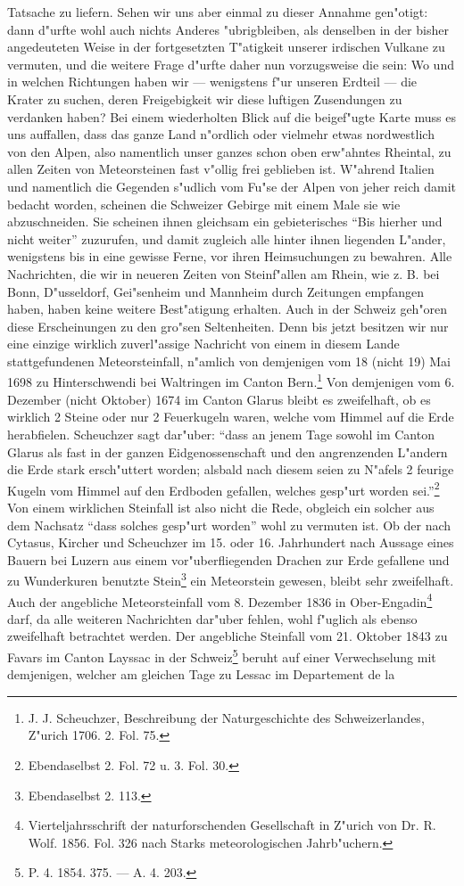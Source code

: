 \documentclass[a4paper, 8pt, oneside, polutonikogreek, german]{article}
\begin{document}
Tatsache zu liefern. Sehen wir uns aber einmal zu dieser Annahme gen"otigt: dann d"urfte wohl auch nichts Anderes "ubrigbleiben, als denselben in der bisher angedeuteten Weise in der fortgesetzten T"atigkeit unserer irdischen Vulkane zu vermuten, und die weitere Frage d"urfte daher nun vorzugsweise die sein: Wo und in welchen Richtungen haben wir --- wenigstens f"ur unseren Erdteil --- die Krater zu suchen, deren Freigebigkeit wir diese luftigen Zusendungen zu verdanken haben? Bei einem wiederholten Blick auf die beigef"ugte Karte muss es uns auffallen, dass das ganze Land n"ordlich oder vielmehr etwas nordwestlich von den Alpen, also namentlich unser ganzes schon oben erw"ahntes Rheintal, zu allen Zeiten von Meteorsteinen fast v"ollig frei geblieben ist. W"ahrend Italien und namentlich die Gegenden s"udlich vom Fu"se der Alpen von jeher reich damit bedacht worden, scheinen die Schweizer Gebirge mit einem Male sie wie abzuschneiden. Sie scheinen ihnen gleichsam ein gebieterisches "`Bis hierher und nicht weiter"' zuzurufen, und damit zugleich alle hinter ihnen liegenden L"ander, wenigstens bis in eine gewisse Ferne, vor ihren Heimsuchungen zu bewahren. Alle Nachrichten, die wir in neueren Zeiten von Steinf"allen am Rhein, wie z. B. bei Bonn, D"usseldorf, Gei"senheim und Mannheim durch Zeitungen empfangen haben, haben keine weitere Best"atigung erhalten. Auch in der Schweiz geh"oren diese Erscheinungen zu den gro"sen Seltenheiten. Denn bis jetzt besitzen wir nur eine einzige wirklich zuverl"assige Nachricht von einem in diesem Lande stattgefundenen Meteorsteinfall, n"amlich von demjenigen vom 18 (nicht 19) Mai 1698 zu Hinterschwendi bei Waltringen im Canton Bern.\footnote{J. J. Scheuchzer, Beschreibung der Naturgeschichte des Schweizerlandes, Z"urich 1706. 2. Fol. 75.} Von demjenigen vom 6. Dezember (nicht Oktober) 1674 im Canton Glarus bleibt es zweifelhaft, ob es wirklich 2 Steine oder nur 2 Feuerkugeln waren, welche vom Himmel auf die Erde herabfielen. Scheuchzer sagt dar"uber: "`dass an jenem Tage sowohl im Canton Glarus als fast in der ganzen Eidgenossenschaft und den angrenzenden L"andern die Erde stark ersch"uttert worden; alsbald nach diesem seien zu N"afels 2 feurige Kugeln vom Himmel auf den Erdboden gefallen, welches gesp"urt worden sei."'\footnote{Ebendaselbst 2. Fol. 72 u. 3. Fol. 30.} Von einem wirklichen Steinfall ist also nicht die Rede, obgleich ein solcher aus dem Nachsatz "`dass solches gesp"urt worden"' wohl zu vermuten ist. Ob der nach Cytasus, Kircher und Scheuchzer im 15. oder 16. Jahrhundert nach Aussage eines Bauern bei Luzern aus einem vor"uberfliegenden Drachen zur Erde gefallene und zu Wunderkuren benutzte Stein\footnote{Ebendaselbst 2. 113.} ein Meteorstein gewesen, bleibt sehr zweifelhaft. Auch der angebliche Meteorsteinfall vom 8. Dezember 1836 in Ober-Engadin\footnote{Vierteljahrsschrift der naturforschenden Gesellschaft in Z"urich von Dr. R. Wolf. 1856. Fol. 326 nach Starks meteorologischen Jahrb"uchern.} darf, da alle weiteren Nachrichten dar"uber fehlen, wohl f"uglich als ebenso zweifelhaft betrachtet werden. Der angebliche Steinfall vom 21. Oktober 1843 zu Favars im Canton Layssac in der Schweiz\footnote{P. 4. 1854. 375. --- A. 4. 203.} beruht auf einer Verwechselung mit demjenigen, welcher am gleichen Tage zu Lessac im Departement de la 
\end{document}
